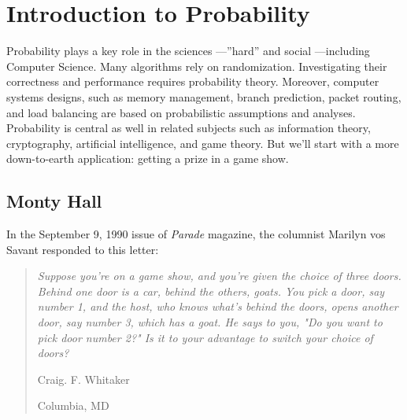 \chapter{Introduction to Probability}\label{probability_chap}


Probability plays a key role in the sciences ---''hard'' and social
---including Computer Science.  Many algorithms rely on randomization.
Investigating their correctness and performance requires probability
theory.  Moreover, computer systems designs, such as memory management,
branch prediction, packet routing, and load balancing are based on
probabilistic assumptions and analyses.  Probability is central as well in
related subjects such as information theory, cryptography, artificial
intelligence, and game theory.  But we'll start with a more down-to-earth
application: getting a prize in a game show.

\section{Monty Hall}

In the September 9, 1990 issue of \textit{Parade} magazine, the
columnist Marilyn vos Savant responded to this letter:


\begin{quotation}
\noindent \textit{Suppose you're on a game show, and you're given the
choice of three doors.  Behind one door is a car, behind the others,
goats.  You pick a door, say number 1, and the host, who knows what's
behind the doors, opens another door, say number 3, which has a goat.
He says to you, "Do you want to pick door number 2?"  Is it to your
advantage to switch your choice of doors?}

\vspace{1ex}

\hspace{3in} Craig. F. Whitaker

\hspace{3in} Columbia, MD
\end{quotation}

